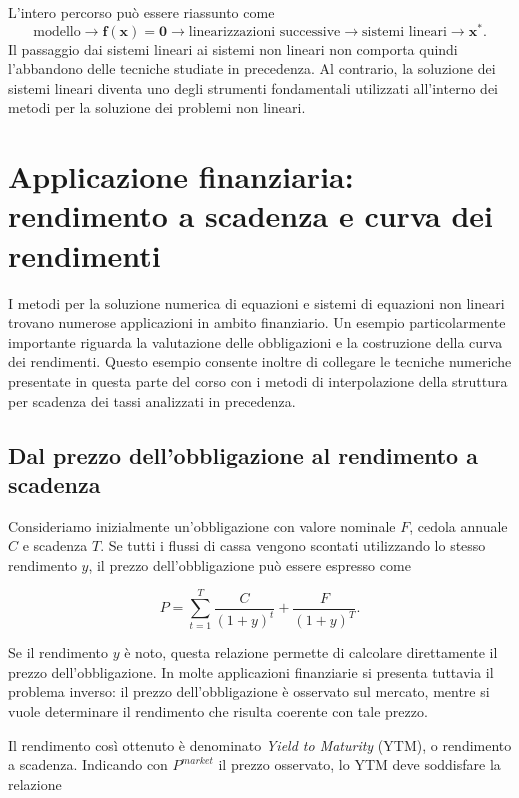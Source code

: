 L'intero percorso può essere riassunto come
\begin{equation*}
\boxed{
\text{modello}
\longrightarrow
\mathbf{f}(\mathbf{x})=\mathbf{0}
\longrightarrow
\text{linearizzazioni successive}
\longrightarrow
\text{sistemi lineari}
\longrightarrow
\mathbf{x}^*.
}
\end{equation*}
Il passaggio dai sistemi lineari ai sistemi non lineari non comporta
quindi l'abbandono delle tecniche studiate in precedenza. Al
contrario, la soluzione dei sistemi lineari diventa uno degli
strumenti fondamentali utilizzati all'interno dei metodi per la
soluzione dei problemi non lineari.

\section{Applicazione finanziaria: rendimento a scadenza e curva dei rendimenti}

I metodi per la soluzione numerica di equazioni e sistemi di equazioni non lineari trovano numerose applicazioni in ambito finanziario. Un esempio particolarmente importante riguarda la valutazione delle obbligazioni e la costruzione della curva dei rendimenti. Questo esempio consente inoltre di collegare le tecniche numeriche presentate in questa parte del corso con i metodi di interpolazione della struttura per scadenza dei tassi analizzati in precedenza.

\subsection{Dal prezzo dell'obbligazione al rendimento a scadenza}

Consideriamo inizialmente un'obbligazione con valore nominale $F$, cedola annuale $C$ e scadenza $T$. Se tutti i flussi di cassa vengono scontati utilizzando lo stesso rendimento $y$, il prezzo dell'obbligazione può essere espresso come

\[
P =
\sum_{t=1}^{T}
\frac{C}{(1+y)^t}
+
\frac{F}{(1+y)^T}.
\]

Se il rendimento $y$ è noto, questa relazione permette di calcolare direttamente il prezzo dell'obbligazione. In molte applicazioni finanziarie si presenta tuttavia il problema inverso: il prezzo dell'obbligazione è osservato sul mercato, mentre si vuole determinare il rendimento che risulta coerente con tale prezzo.

Il rendimento così ottenuto è denominato \emph{Yield to Maturity} (YTM), o rendimento a scadenza. Indicando con $P^{market}$ il prezzo osservato, lo YTM deve soddisfare la relazione

